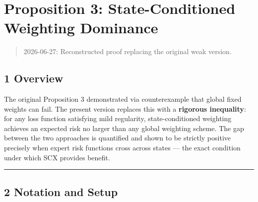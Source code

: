 \documentclass[
  12pt,
]{article}
\author{SCX}
\date{2026}
\begin{document}
\section{Proposition 3: State-Conditioned Weighting
Dominance}\label{proposition-3-state-conditioned-weighting-dominance}

\begin{quote}
2026-06-27: Reconstructed proof replacing the original weak version.
\end{quote}

\subsection{1 Overview}\label{overview}

The original Proposition 3 demonstrated via counterexample that global
fixed weights can fail. The present version replaces this with a
\textbf{rigorous inequality}: for any loss function satisfying mild
regularity, state-conditioned weighting achieves an expected risk no
larger than any global weighting scheme. The gap between the two
approaches is quantified and shown to be strictly positive precisely
when expert risk functions cross across states --- the exact condition
under which SCX provides benefit.

\begin{center}\rule{0.5\linewidth}{0.5pt}\end{center}

\subsection{2 Notation and Setup}\label{notation-and-setup}
\end{document}
